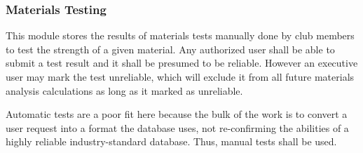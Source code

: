 \documentclass[12pt, titlepage]{article}
\begin{document}
\subsubsection{Materials Testing}

This module stores the results of materials tests manually done by club members to test the strength of a given 
material. Any authorized user shall be able to submit a test result and it shall be presumed to be reliable.
However an executive user may mark the test unreliable, which will exclude it from all future materials analysis calculations
as long as it marked as unreliable. 

Automatic tests are a poor fit here because the bulk of the work is to convert a user request into a format the 
database uses, not re-confirming the abilities of a highly reliable industry-standard database. Thus, manual
tests shall be used.
\end{document}
